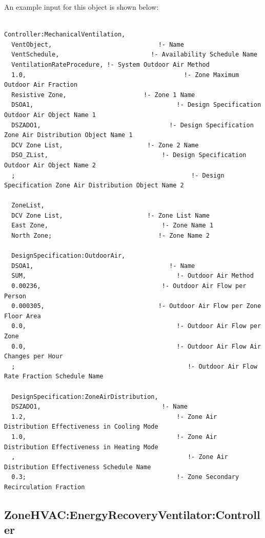 An example input for this object is shown below:

\begin{lstlisting}

Controller:MechanicalVentilation,
  VentObject,                             !- Name
  VentSchedule,                         !- Availability Schedule Name
  VentilationRateProcedure, !- System Outdoor Air Method
  1.0,                                           !- Zone Maximum Outdoor Air Fraction
  Resistive Zone,                     !- Zone 1 Name
  DSOA1,                                       !- Design Specification Outdoor Air Object Name 1
  DSZADO1,                                   !- Design Specification Zone Air Distribution Object Name 1
  DCV Zone List,                       !- Zone 2 Name
  DSO_ZList,                               !- Design Specification Outdoor Air Object Name 2
  ;                                                !- Design Specification Zone Air Distribution Object Name 2

  ZoneList,
  DCV Zone List,                       !- Zone List Name
  East Zone,                               !- Zone Name 1
  North Zone;                             !- Zone Name 2

  DesignSpecification:OutdoorAir,
  DSOA1,                                     !- Name
  SUM,                                         !- Outdoor Air Method
  0.00236,                                 !- Outdoor Air Flow per Person
  0.000305,                               !- Outdoor Air Flow per Zone Floor Area
  0.0,                                         !- Outdoor Air Flow per Zone
  0.0,                                         !- Outdoor Air Flow Air Changes per Hour
  ;                                               !- Outdoor Air Flow Rate Fraction Schedule Name

  DesignSpecification:ZoneAirDistribution,
  DSZADO1,                                 !- Name
  1.2,                                         !- Zone Air Distribution Effectiveness in Cooling Mode
  1.0,                                         !- Zone Air Distribution Effectiveness in Heating Mode
  ,                                               !- Zone Air Distribution Effectiveness Schedule Name
  0.3;                                         !- Zone Secondary Recirculation Fraction
\end{lstlisting}

\subsection{ZoneHVAC:EnergyRecoveryVentilator:Controller}\label{zonehvacenergyrecoveryventilatorcontroller}

